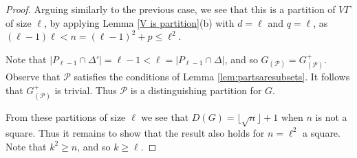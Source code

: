 \documentclass[11pt]{amsart}
\begin{document}
\begin{proof}
Arguing similarly to the previous case, we see that this is a partition of  \(V\Gamma\) of size $\ell$,
by applying Lemma \ref{V is partition}(b) with $d = \ell$ and $q = \ell$, as $(\ell-1)\ell<n=(\ell-1)^{2}+p\leqslant \ell^2.$

Note that \(|P_{\ell - 1}\cap\Delta'|=\ell-1<\ell=|P_{\ell - 1}\cap\Delta|\),
and so $G_{(\mathcal{P})}=G^+_{(\mathcal{P})}$. 
Observe that \(\mathcal{P}\) satisfies the conditions of Lemma \ref{lem:partsaresubsets}. It follows that $G^+_{(\mathcal{P})}$ is trivial.
Thus $\mathcal{P}$ is a distinguishing partition for $G$.

%
%





From these partitions of size \(\ell\)  we see that \(D(G)=\lfloor \sqrt{n}\rfloor+1\) when \(n\) is not a square.
Thus it remains to show that the result also holds for \(n=\ell^{2}\) a square.
Note that \(k^{2}\geqslant n\), and so \(k\geqslant \ell\). 


\end{proof}
\end{document}
